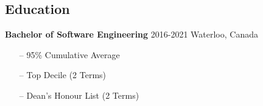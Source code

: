 \documentclass{resume}
\begin{document}
\begin{sidebar}
    \section{Education}\vspace{-0.2cm}
      \color{tagText}\textbf{Bachelor of Software Engineering}
      \color{tagText}2016-2021 \separator \color{tagText}Waterloo, Canada
      \color{bodyText}
      \begin{itemize}[leftmargin=0.45cm, noitemsep, topsep=0.0cm]%
        \item[--] 95\% Cumulative Average
        \item[--] Top Decile (2 Terms)
        \item[--] Dean's Honour List (2 Terms)
      \end{itemize}%
  \end{sidebar}
\end{document}

